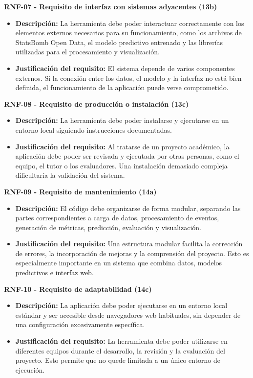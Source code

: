 \textbf{RNF-07 - Requisito de interfaz con sistemas adyacentes (13b)}

\begin{itemize}
    \item \textbf{Descripción:} La herramienta debe poder interactuar correctamente con los elementos externos necesarios para su funcionamiento, como los archivos de StatsBomb Open Data, el modelo predictivo entrenado y las librerías utilizadas para el procesamiento y visualización.
    \item \textbf{Justificación del requisito:} El sistema depende de varios componentes externos. Si la conexión entre los datos, el modelo y la interfaz no está bien definida, el funcionamiento de la aplicación puede verse comprometido.
\end{itemize}

\textbf{RNF-08 - Requisito de producción o instalación (13c)}

\begin{itemize}
    \item \textbf{Descripción:} La herramienta debe poder instalarse y ejecutarse en un entorno local siguiendo instrucciones documentadas.
    \item \textbf{Justificación del requisito:} Al tratarse de un proyecto académico, la aplicación debe poder ser revisada y ejecutada por otras personas, como el equipo, el tutor o los evaluadores. Una instalación demasiado compleja dificultaría la validación del sistema.
\end{itemize}

\textbf{RNF-09 - Requisito de mantenimiento (14a)}

\begin{itemize}
    \item \textbf{Descripción:} El código debe organizarse de forma modular, separando las partes correspondientes a carga de datos, procesamiento de eventos, generación de métricas, predicción, evaluación y visualización.
    \item \textbf{Justificación del requisito:} Una estructura modular facilita la corrección de errores, la incorporación de mejoras y la comprensión del proyecto. Esto es especialmente importante en un sistema que combina datos, modelos predictivos e interfaz web.
\end{itemize}

\textbf{RNF-10 - Requisito de adaptabilidad (14c)}

\begin{itemize}
    \item \textbf{Descripción:} La aplicación debe poder ejecutarse en un entorno local estándar y ser accesible desde navegadores web habituales, sin depender de una configuración excesivamente específica.
    \item \textbf{Justificación del requisito:} La herramienta debe poder utilizarse en diferentes equipos durante el desarrollo, la revisión y la evaluación del proyecto. Esto permite que no quede limitada a un único entorno de ejecución.
\end{itemize}

